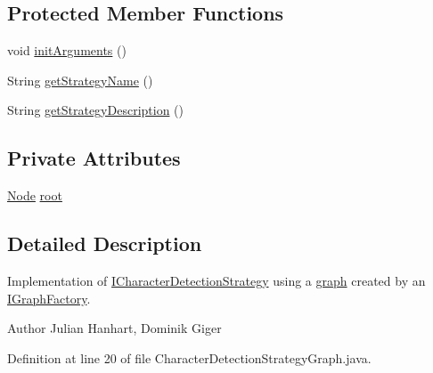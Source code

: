 \subsection*{Protected Member Functions}
\begin{DoxyCompactItemize}
\item 
void \hyperlink{classch_1_1zhaw_1_1ba10__bsha__1_1_1strategies_1_1CharacterDetectionStrategyGraph_ab1ddc7964a2da79d65ca7227423ae8c6}{initArguments} ()
\item 
String \hyperlink{classch_1_1zhaw_1_1ba10__bsha__1_1_1strategies_1_1CharacterDetectionStrategyGraph_a3d897fb9be39b36575cf7d4630580445}{getStrategyName} ()
\item 
String \hyperlink{classch_1_1zhaw_1_1ba10__bsha__1_1_1strategies_1_1CharacterDetectionStrategyGraph_a29a9028d4b5f045527297dc35f4155de}{getStrategyDescription} ()
\end{DoxyCompactItemize}
\subsection*{Private Attributes}
\begin{DoxyCompactItemize}
\item 
\hyperlink{classch_1_1zhaw_1_1ba10__bsha__1_1_1graph_1_1Node}{Node} \hyperlink{classch_1_1zhaw_1_1ba10__bsha__1_1_1strategies_1_1CharacterDetectionStrategyGraph_a8c963ad3d95559024da1e8f790e4710b}{root}
\end{DoxyCompactItemize}


\subsection{Detailed Description}
Implementation of \hyperlink{interfacech_1_1zhaw_1_1ba10__bsha__1_1_1strategies_1_1ICharacterDetectionStrategy}{ICharacterDetectionStrategy} using a \hyperlink{namespacech_1_1zhaw_1_1ba10__bsha__1_1_1graph}{graph} created by an \hyperlink{}{IGraphFactory}.

\begin{DoxyAuthor}{Author}
Julian Hanhart, Dominik Giger 
\end{DoxyAuthor}


Definition at line 20 of file CharacterDetectionStrategyGraph.java.

